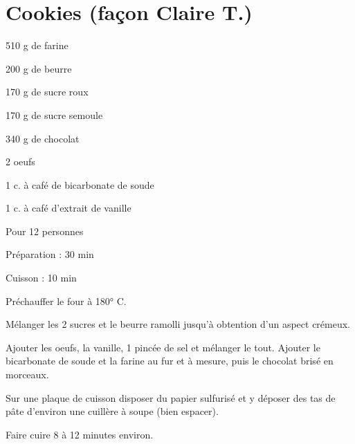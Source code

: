 \section[\normalsize{Cookies (façon Claire T.)}]{Cookies (façon Claire T.)}
\begin{ingredients}
\item 510 g de farine
\item 200 g de beurre
\item 170 g de sucre roux
\item 170 g de sucre semoule
\item 340 g de chocolat
\item 2 oeufs
\item 1 c. à café de bicarbonate de soude
\item 1 c. à café d'extrait de vanille
\end{ingredients}
\begin{infos}
\item Pour 12 personnes
\item Préparation : 30 min
\item Cuisson : 10 min
\end{infos}
\begin{etapes}
\item Préchauffer le four à 180° C.
\item Mélanger les 2 sucres et le beurre ramolli jusqu'à 
obtention d'un aspect crémeux.
\item Ajouter les oeufs, la vanille, 1 pincée de sel et mélanger 
le tout. Ajouter le bicarbonate de soude et la farine au fur et à mesure, puis le chocolat 
brisé en morceaux.
\item Sur une plaque de cuisson disposer du papier sulfurisé et y déposer des tas de p\^ate 
d'environ une cuill\`ere à soupe (bien espacer).
\item Faire cuire 8 à 12 minutes environ.
\end{etapes}
\begin{conseils}
\end{conseils}
